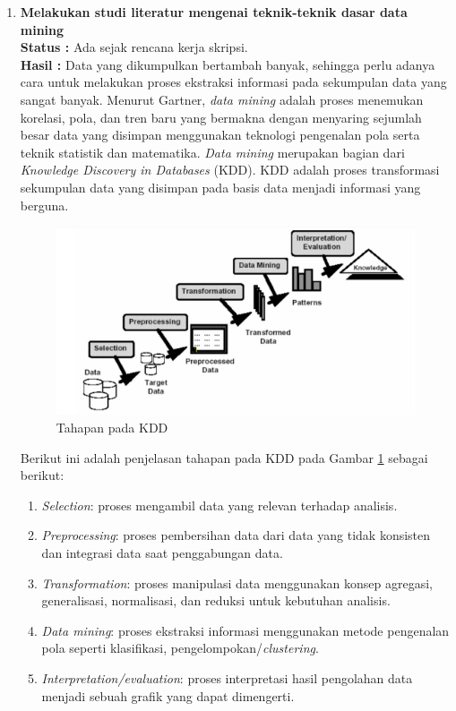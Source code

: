 \documentclass[a4paper,twoside]{article}
\begin{document}
	\begin{enumerate}
		\item \textbf{Melakukan studi literatur mengenai teknik-teknik dasar data mining}\\
		{\bf Status :} Ada sejak rencana kerja skripsi.\\
		{\bf Hasil :} Data yang dikumpulkan bertambah banyak, sehingga perlu adanya cara untuk melakukan proses ekstraksi informasi pada sekumpulan data yang sangat banyak. Menurut Gartner, \textit{data mining} adalah proses menemukan korelasi, pola, dan tren baru yang bermakna dengan menyaring sejumlah besar data yang disimpan menggunakan teknologi pengenalan pola serta teknik statistik dan matematika. \textit{Data mining} merupakan bagian dari \textit{Knowledge Discovery in Databases} (KDD). KDD adalah proses transformasi sekumpulan data yang disimpan pada basis data menjadi informasi yang berguna.\\

\begin{figure}[H]
	\centering
	\includegraphics[scale=0.4]{datamining1}
	\caption{Tahapan pada KDD}
	\label{fig:datamining1}
\end{figure}

\noindent Berikut ini adalah penjelasan tahapan pada KDD pada Gambar \ref{fig:datamining1} sebagai berikut:

\begin{enumerate}
\item \textit{Selection}: proses mengambil data yang relevan terhadap analisis.
\item \textit{Preprocessing}: proses pembersihan data dari data yang tidak konsisten dan integrasi data saat penggabungan data.
\item \textit{Transformation}: proses manipulasi data menggunakan konsep agregasi, generalisasi, normalisasi, dan reduksi untuk kebutuhan analisis.
\item \textit{Data mining}: proses ekstraksi informasi menggunakan metode pengenalan pola seperti klasifikasi, pengelompokan/\textit{clustering}.
\item \textit{Interpretation/evaluation}: proses interpretasi hasil pengolahan data menjadi sebuah grafik yang dapat dimengerti.
\end{enumerate}


\end{enumerate}
\end{document}
